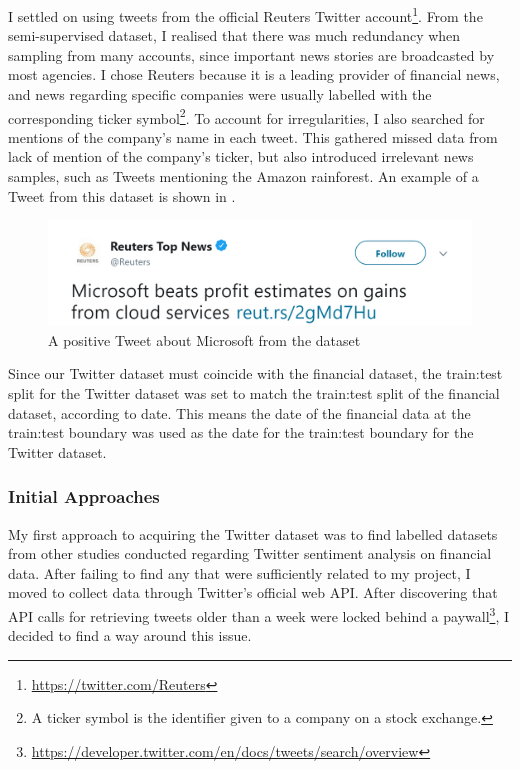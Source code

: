 \documentclass[12pt,a4paper,twoside,openright]{report}
\begin{document}
I settled on using tweets from the official Reuters Twitter account\footnote{\url{https://twitter.com/Reuters}}.
From the semi-supervised dataset, I realised that there was much redundancy
when sampling from many accounts, since important news stories are broadcasted by most agencies.
I chose Reuters because it is a leading provider of financial news, and
news regarding specific companies were usually labelled with the corresponding ticker symbol\footnote{A ticker symbol is the identifier given to a company on
a stock exchange.}. To account for irregularities,
I also searched for mentions of the company's name in each tweet. This gathered missed data from lack of mention of the company's ticker, but also introduced
irrelevant news samples, such as Tweets mentioning the Amazon rainforest. An example of a Tweet from
this dataset is shown in .

\begin{figure}[H]
\centering
\vspace{10pt}
\includegraphics[width=\textwidth]{ReutersTweetMSFT.png}
\caption{A positive Tweet about Microsoft from the dataset}
\label{fig:reutersMSFT}
\end{figure}


Since our Twitter dataset must coincide with the financial dataset, the train:test split
for the Twitter dataset was set to match the train:test split of the financial
dataset, according to date. This means the date of the financial data at the
train:test boundary was used as the date for the train:test boundary for the Twitter
dataset.

\subsubsection{Initial Approaches}
My first approach to acquiring the Twitter dataset was to find labelled datasets from other studies
conducted regarding Twitter sentiment analysis on financial data. After failing to find any that 
were sufficiently related to my project, I moved to collect data through Twitter's official web API.
After discovering that API calls for retrieving tweets older than a week were locked
behind a paywall\footnote{\url{https://developer.twitter.com/en/docs/tweets/search/overview}}, I decided to find a way around this issue.
\end{document}
